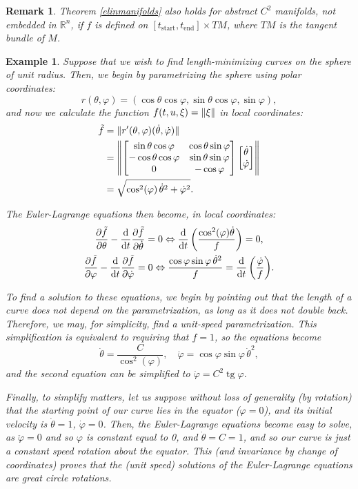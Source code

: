 \documentclass{article}
\theoremstyle{plain}
\newtheorem{remark}{Remark}
\newtheorem{example}{Example}
\theoremstyle{nonumberplain}
\newcommand{\R}{\mathbb{R}}
\newcommand{\tstart}{\mathrm{start}}
\newcommand{\tend}{\mathrm{end}}
\DeclarePairedDelimiter\norm{\lVert}{\rVert}
\DeclareMathOperator{\tg}{tg}
\begin{document}
\begin{remark}
Theorem \ref{elinmanifolds} also holds for abstract $C^2$ manifolds, not embedded in $\R^n$, if $f$ is defined on $[t_\tstart, t_\tend] \times TM$, where $TM$ is the tangent bundle of $M$.
\end{remark}

\begin{example}
Suppose that we wish to find length-minimizing curves on the sphere of unit radius. Then, we begin by parametrizing the sphere using polar coordinates:
\[r(\theta, \varphi) = (\cos\theta \cos\varphi, \sin\theta \cos\varphi, \sin\varphi),\]
and now we calculate the function $f(t,u,\xi) = \norm\xi$ in local coordinates:
\begin{align*}
\tilde f &= \norm{r'(\theta, \varphi) (\dot \theta, \dot \varphi)}\\
&= \norm*{\begin{bmatrix}
\sin\theta \cos\varphi & \cos\theta \sin\varphi\\
-\cos\theta \cos\varphi & \sin\theta \sin\varphi\\
0 & -\cos\varphi
\end{bmatrix}
\begin{bmatrix}
\dot\theta\\
\dot\varphi
\end{bmatrix}
}\\
&= \sqrt{\cos^2(\varphi) \, \dot\theta^2 + \dot\varphi^2}.
\end{align*}

The Euler-Lagrange equations then become, in local coordinates:
\begin{gather*}
\diffp{\tilde f} \theta - \diff*{\diffp{\tilde f}{\dot \theta}}t = 0 \Leftrightarrow \diff*{\left( \frac{\cos^2(\varphi) \dot \theta}{f} \right)}t = 0,\\
\diffp{\tilde f} \varphi - \diff*{\diffp{\tilde f}{\dot \varphi}}t = 0
\Leftrightarrow
\frac{\cos\varphi \sin\varphi \,\dot \theta^2}{f} = \diff*{\left( \frac{\dot \varphi}{f} \right)}t.
\end{gather*}

To find a solution to these equations, we begin by pointing out that the length of a curve does not depend on the parametrization, as long as it does not double back. Therefore, we may, for simplicity, find a unit-speed parametrization. This simplification is equivalent to requiring that $f = 1$, so the equations become
\[\dot \theta = \frac C {\cos^2(\varphi)}, \quad \ddot \varphi = \cos\varphi \sin\varphi \, \dot \theta^2,\]
and the second equation can be simplified to $\ddot \varphi = C^2 \tg \varphi$.

Finally, to simplify matters, let us suppose without loss of generality (by rotation) that the starting point of our curve lies in the equator ($\varphi = 0$), and its initial velocity is $\dot\theta = 1$, $\dot \varphi = 0$. Then, the Euler-Lagrange equations become easy to solve, as $\ddot \varphi = 0$ and so $\varphi$ is constant equal to 0, and $\dot \theta = C = 1$, and so our curve is just a constant speed rotation about the equator. This (and invariance by change of coordinates) proves that the (unit speed) solutions of the Euler-Lagrange equations are great circle rotations.
\end{example}
\end{document}

